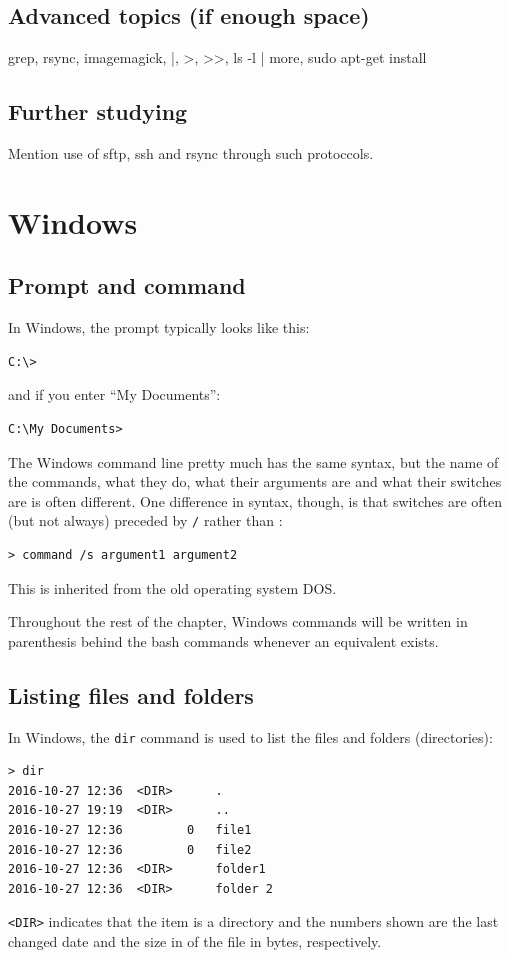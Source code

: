 \subsection{Advanced topics (if enough space)}
grep, rsync, imagemagick, |, >, >>, ls -l | more, sudo apt-get install

\subsection{Further studying}
Mention use of sftp, ssh and rsync through such protoccols. 

\section{Windows}

\subsection{Prompt and command}

In Windows, the prompt typically looks like this:
\begin{verbatim}
C:\>
\end{verbatim}
and if you enter ``My Documents'':
\begin{verbatim}
C:\My Documents>
\end{verbatim}

The Windows command line pretty much has the same syntax, but the name of the commands, what they do, what their arguments are and what their switches are is often different. One difference in syntax, though, is that switches are often (but not always) preceded by \verb$/$ rather than \bashin{-}:

\begin{verbatim}
> command /s argument1 argument2
\end{verbatim}
This is inherited from the old operating system DOS.

Throughout the rest of the chapter, Windows commands will be written in parenthesis behind the bash commands whenever an equivalent exists.


\subsection{Listing files and folders}
In Windows, the \verb|dir| command is used to list the files and folders (directories):

\begin{Verbatim}[commandchars=\\\{\}]
> dir
2016-10-27 12:36  <DIR>      .
2016-10-27 19:19  <DIR>      ..
2016-10-27 12:36         0   file1
2016-10-27 12:36         0   file2
2016-10-27 12:36  <DIR>      folder1
2016-10-27 12:36  <DIR>      folder 2
\end{Verbatim}
\verb|<DIR>| indicates that the item is a directory and the numbers shown are the last changed date and the size in of the file in bytes, respectively.


